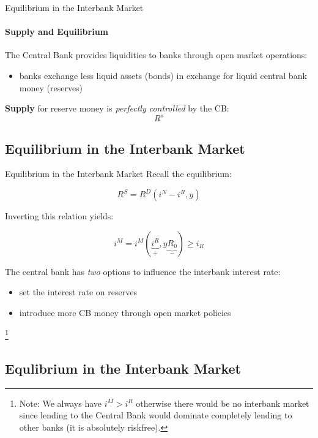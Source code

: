 \documentclass[
  ignorenonframetext,
  aspectratio=169,
]{beamer}
\providecommand{\tightlist}{%
  \setlength{\itemsep}{0pt}\setlength{\parskip}{0pt}}\usepackage{longtable,booktabs,array}
\begin{document}
\begin{frame}{Equilibrium in the Interbank Market}
\framesubtitle{Supply and Equilibrium}

The Central Bank provides liquidities to banks through open market
operations:

\begin{itemize}
\tightlist
\item
  banks exchange less liquid assets (bonds) in exchange for liquid
  central bank money (reserves)
\end{itemize}

\textbf{Supply} for reserve money is \emph{perfectly controlled} by the
CB: \[R^s\]
\end{frame}

\subsection{Equilibrium in the Interbank
Market}\label{equilibrium-in-the-interbank-market-2}

\begin{frame}{Equilibrium in the Interbank Market}
Recall the equilibrium:

\[R^S = R^D \left(i^N - i^R, y \right)\]

Inverting this relation yields:

\[i^M = i^M\left(\underbrace{i^R}_{+}, y \underbrace{R_0}_{-} \right) \geq i_R\]

The central bank has \emph{two} options to influence the interbank
interest rate:

\begin{itemize}
\tightlist
\item
  set the interest rate on reserves
\item
  introduce more CB money through open market policies
\end{itemize}

\footnote{Note: We always have $i^M>i^R$ otherwise there would be no interbank market since lending to the Central Bank would dominate completely lending to other banks (it is absolutely riskfree).}
\end{frame}

\subsection{Equlibrium in the Interbank
Market}\label{equlibrium-in-the-interbank-market}
\end{document}
